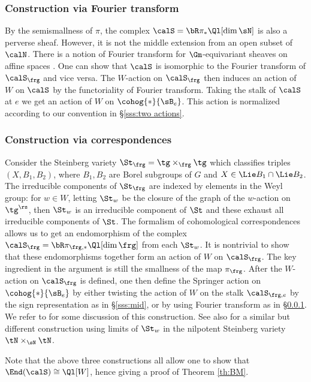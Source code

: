 \subsubsection{Construction via Fourier transform}\label{sss:Four} By the semismallness of $\pi$,  the complex $\calS=\bR\pi_{*}\Ql[\dim\sN]$ is also a perverse sheaf. However, it is not the middle extension from an open subset of $\calN$. There is a notion of Fourier transform for $\Gm$-equivariant sheaves on affine spaces \cite{Laumon}. One can show that $\calS$ is isomorphic to the Fourier transform of $\calS_{\frg}$ and vice versa. The $W$-action on $\calS_{\frg}$ then induces an action of $W$ on $\calS$ by the functoriality of Fourier transform. Taking the stalk of $\calS$ at $e$ we get an action of $W$ on $\cohog{*}{\sB_{e}}$. This action is normalized according to our convention in \S\ref{sss:two actions}.

\subsubsection{Construction via correspondences}  Consider the Steinberg variety $\St_{\frg}=\tg\times_{\frg}\tg$ which classifies triples $(X,B_{1},B_{2})$, where $B_{1},B_{2}$ are Borel subgroups of $G$ and $X\in\Lie B_{1}\cap\Lie B_{2}$. The irreducible components of $\St_{\frg}$ are indexed by elements in the Weyl group: for $w\in W$, letting $\St_{w}$ be the closure of the graph of the $w$-action on $\tg^{\rs}$, then $\St_{w}$ is  an irreducible component of $\St$ and these exhaust all irreducible components of $\St$. The formalism of cohomological correspondences allows us to get an endomorphism of the complex $\calS_{\frg}=\bR\pi_{\frg,*}\Ql[\dim\frg]$ from each $\St_{w}$. It is nontrivial to show that these endomorphisms together form an action of $W$ on $\calS_{\frg}$. The key ingredient in the argument is still the smallness of the map $\pi_{\frg}$. After the $W$-action on $\calS_{\frg}$ is defined, one then define the Springer action on $\cohog{*}{\sB_{e}}$ by either twisting the action of $W$ on the stalk $\calS_{\frg, e}$ by the sign representation as in \S\ref{sss:mid}, or by using Fourier transform as in \S\ref{sss:Four}. We refer to \cite[Remark 3.3.4]{GS} for some discussion of this construction. See also \cite[\S3.4]{CG} for a similar but different construction using limits of $\St_{w}$ in the nilpotent Steinberg variety $\tN\times_{\sN}\tN$. 

Note that the above three constructions all allow one to show that $\End(\calS)\cong\Ql[W]$, hence giving a proof of Theorem \ref{th:BM}.


